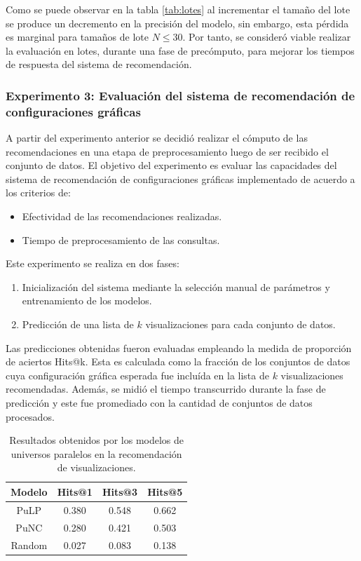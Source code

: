     Como se puede observar en la tabla \ref{tab:lotes} al incrementar el tama\~no del lote
    se produce un decremento en la precisi\'on del modelo, sin embargo, esta p\'erdida es marginal
    para tama\~nos de lote $N \leq 30$. Por tanto, se consider\'o viable realizar
    la evaluaci\'on en lotes, durante una fase de prec\'omputo, para mejorar los tiempos de respuesta del sistema de recomendaci\'on.


    \subsubsection{Experimento 3: Evaluaci\'on del sistema de recomendaci\'on de configuraciones gr\'aficas}

    A partir del experimento anterior se decidi\'o realizar el c\'omputo de las recomendaciones
    en una etapa de preprocesamiento luego de ser recibido el conjunto de datos.
    El objetivo del experimento es evaluar las capacidades del sistema
    de recomendaci\'on de configuraciones gr\'aficas implementado
     de acuerdo a los criterios de: \begin{itemize}
    \item Efectividad de las recomendaciones realizadas.
    \item Tiempo de preprocesamiento de las consultas.
    \end{itemize}
Este experimento se realiza en dos fases:
\begin{enumerate}
    \item Inicializaci\'on del sistema mediante la selecci\'on manual de par\'ametros y entrenamiento
    de los modelos.
    \item Predicci\'on de una lista de $k$ visualizaciones para cada conjunto de datos.
\end{enumerate}

    Las predicciones obtenidas fueron evaluadas empleando la medida de proporci\'on
    de aciertos Hits@k. Esta es calculada como la fracci\'on de los conjuntos de datos cuya configuraci\'on gr\'afica
    esperada fue inclu\'ida en la lista de $k$ visualizaciones recomendadas. Adem\'as, se midi\'o
    el tiempo transcurrido durante la fase de predicci\'on y este fue promediado con la cantidad de conjuntos de datos
    procesados.


 \begin{table}[H]
        \centering
        \begin{tabular}{ |c|c|c|c|}
            \hline
            \bf Modelo & \bf Hits@1 & \bf Hits@3 & \bf Hits@5\\
            \hline
            PuLP & 0.380&  0.548& 0.662\\
            PuNC &  0.280& 0.421& 0.503\\
            Random &  0.027 & 0.083 & 0.138\\
            \hline
        \end{tabular}
        \caption{Resultados obtenidos por los modelos de universos paralelos en la recomendaci\'on de visualizaciones.}
    \end{table}

